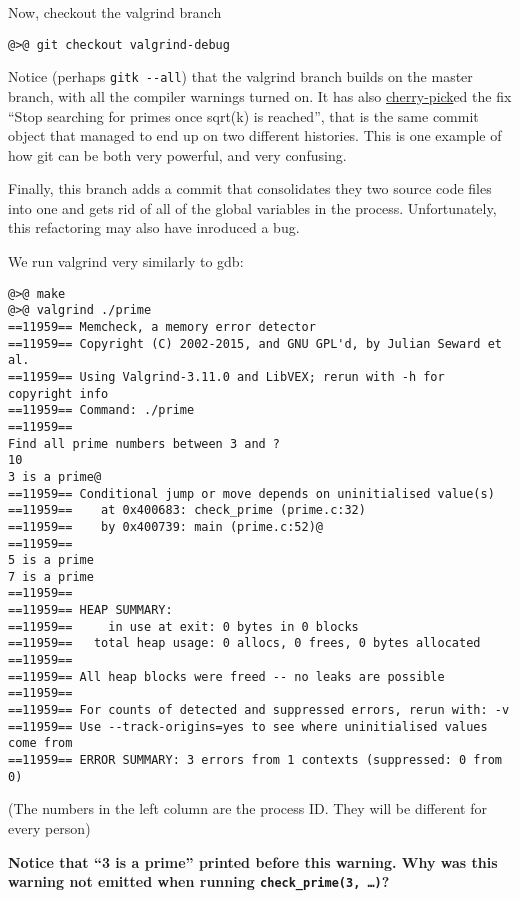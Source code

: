 \documentclass{article}
\begin{document}
Now, checkout the valgrind branch
\begin{lstlisting}
@>@ git checkout valgrind-debug
\end{lstlisting}

Notice (perhaps \texttt{gitk~-{}-all}) that the valgrind branch builds on the
master branch, with all the compiler warnings turned on. It has also
\ul{cherry-pick}ed the fix ``Stop searching for primes once sqrt(k) is
reached'', that is the same commit object that managed to end up on two
different histories.  This is one example of how git can be both very
powerful, and very confusing.

Finally, this branch adds a commit that consolidates they two source code
files into one and gets rid of all of the global variables in the process.
Unfortunately, this refactoring may also have inroduced a bug.

We run valgrind very similarly to gdb:
\begin{lstlisting}
@>@ make
@>@ valgrind ./prime
==11959== Memcheck, a memory error detector
==11959== Copyright (C) 2002-2015, and GNU GPL'd, by Julian Seward et al.
==11959== Using Valgrind-3.11.0 and LibVEX; rerun with -h for copyright info
==11959== Command: ./prime
==11959== 
Find all prime numbers between 3 and ?
10
3 is a prime@
==11959== Conditional jump or move depends on uninitialised value(s)
==11959==    at 0x400683: check_prime (prime.c:32)
==11959==    by 0x400739: main (prime.c:52)@
==11959== 
5 is a prime
7 is a prime
==11959== 
==11959== HEAP SUMMARY:
==11959==     in use at exit: 0 bytes in 0 blocks
==11959==   total heap usage: 0 allocs, 0 frees, 0 bytes allocated
==11959== 
==11959== All heap blocks were freed -- no leaks are possible
==11959== 
==11959== For counts of detected and suppressed errors, rerun with: -v
==11959== Use --track-origins=yes to see where uninitialised values come from
==11959== ERROR SUMMARY: 3 errors from 1 contexts (suppressed: 0 from 0)
\end{lstlisting}
{\small (The numbers in the left column are the process ID. They will be
  different for every person)}

\newpage
\textbf{Notice that ``3 is a prime'' printed before this warning. Why was this
  warning not emitted when running \texttt{check\_prime(3,~\dots)}?}
\vspace{2cm}
\end{document}

